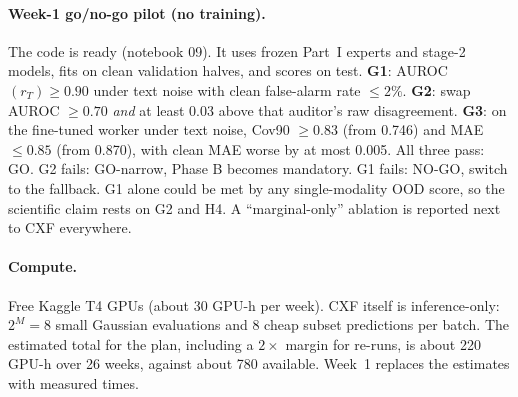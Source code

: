 \documentclass[10pt,twocolumn]{article}
\begin{document}
\paragraph{Week-1 go/no-go pilot (no training).} The code is ready (notebook 09). It uses frozen Part~I experts and
stage-2 models, fits on clean validation halves, and scores on test.
\textbf{G1}: AUROC$(r_T)\geq0.90$ under text noise with clean false-alarm rate $\leq2\%$.
\textbf{G2}: swap AUROC $\geq0.70$ \emph{and} at least 0.03 above that auditor's raw disagreement.
\textbf{G3}: on the fine-tuned worker under text noise, Cov90 $\geq0.83$ (from 0.746) and MAE $\leq0.85$ (from 0.870),
with clean MAE worse by at most 0.005.
All three pass: GO. G2 fails: GO-narrow, Phase B becomes mandatory. G1 fails: NO-GO, switch to the fallback.
G1 alone could be met by any single-modality OOD score, so the scientific claim rests on G2 and H4. A
``marginal-only'' ablation is reported next to CXF everywhere.

\paragraph{Compute.} Free Kaggle T4 GPUs (about 30 GPU-h per week). CXF itself is inference-only: $2^M=8$ small
Gaussian evaluations and 8 cheap subset predictions per batch. The estimated total for the plan, including a $2\times$
margin for re-runs, is about 220 GPU-h over 26 weeks, against about 780 available. Week~1 replaces the estimates with
measured times.

\begin{table}[t]
\centering\small
\caption{Timeline (26 weeks).}
\end{table}
\end{document}
